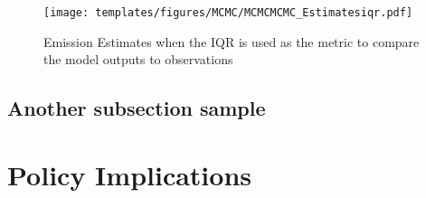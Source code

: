 \begin{figure}[H]
  \texttt{[image: templates/figures/MCMC/MCMCMCMC\_Estimatesiqr.pdf]}
  \centering
  \caption{Emission Estimates when the IQR is used as the metric to compare the model outputs to observations }
  \label{fig:MCMC_estimates95}
\end{figure}
\FloatBarrier
\begin{flushleft}

\end{flushleft}



\subsection{Another subsection sample}
\section{Policy Implications}